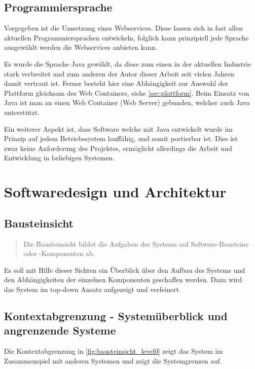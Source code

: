 \subsection{Programmiersprache}
Vorgegeben ist die Umsetzung eines \glspl{Webservice}. Diese lassen sich in fast allen aktuellen Programmiersprachen entwickeln, folglich kann prinzipiell jede Sprache ausgewählt werden die Webservices anbieten kann.  

Es wurde die Sprache Java gewählt, da diese zum einen in der aktuellen Industrie stark verbreitet und zum anderen der Autor dieser Arbeit seit vielen Jahren damit vertraut ist. Ferner besteht hier eine Abhängigkeit zur Auswahl der Plattform gleichsam des Web Containers, siehe \autoref{sec:plattform}. Beim Einsatz von Java ist man an einen Web Container (Web Server) gebunden, welcher auch Java unterstützt. 

Ein weiterer Aspekt ist, dass Software welche mit Java entwickelt wurde im Prinzip auf jedem Betriebssystem lauffähig, und somit portierbar ist. Dies ist zwar keine Anforderung des Projektes, ermöglicht allerdings die Arbeit und Entwicklung in beliebigen Systemen. 

\section{Softwaredesign und Architektur}

\subsection{Bausteinsicht}
\begin{quotation}
Die Bausteinsicht bildet die Aufgaben des Systems auf Software-Bausteine oder -Komponenten ab.
 \citep[S. 98ff][]{starke}	
\end{quotation}

Es soll mit Hilfe dieser Sichten ein Überblick über den Aufbau des Systems und den Abhängigkeiten der einzelnen Komponenten geschaffen werden. Dazu wird das System im top-down Ansatz aufgezeigt und verfeinert. 

\subsection{Kontextabgrenzung - Systemüberblick und angrenzende Systeme}

Die Kontextabgrenzung in \autoref{fig:bausteinsicht_level0} zeigt das System im Zusammenspiel mit anderen Systemen und zeigt die Systemgrenzen auf. 

